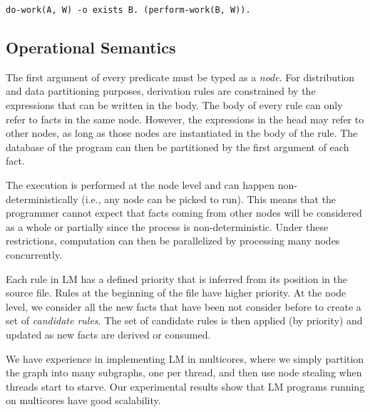 \begin{Verbatim}
do-work(A, W) -o exists B. (perform-work(B, W)).
\end{Verbatim}

\subsection{Operational Semantics}

The first argument of every predicate must be typed as a \emph{node}.
For distribution and data partitioning purposes, derivation rules are constrained by the expressions that can be written in the body.
The body of every rule can only refer to facts in the same node.
However, the expressions in the head may refer to other nodes, as long as those nodes are instantiated in the body of the rule.
The database of the program can then be partitioned by the first argument of each fact.

The execution is performed at the node level and can happen non-deterministically (i.e., any node can
be picked to run). This means that the programmer cannot expect
that facts coming from other nodes will be considered as a whole or partially since the process is non-deterministic.
Under these restrictions, computation can then be parallelized by processing many nodes concurrently.

Each rule in LM has a defined priority that is inferred from its position in the source file.
Rules at the beginning of the file have higher priority. At the node level, we consider all
the new facts that have been not consider before to create a set of \emph{candidate rules}.
The set of candidate rules is then applied (by priority) and updated as new facts are derived or consumed.

We have experience in implementing LM in multicores, where we simply partition the graph into many subgraphs, one per thread, and then
use node stealing when threads start to starve. Our experimental results show that LM programs running on multicores
have good scalability.
